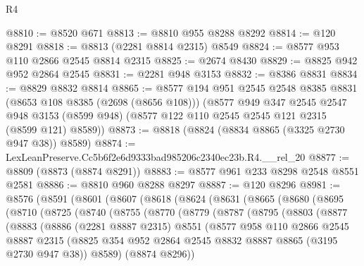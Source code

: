 \begin{lexlean}{R4}
\begin{coremodule}
@8810 := @8520 @671
@8813 := @8810 @955 @8288 @8292
@8814 := @120 @8291
@8818 := @8813 (@2281 @8814 @2315) @8549
@8824 := @8577 @953 @110 @2866 @2545 @8814 @2315
@8825 := @2674 @8430
@8829 := @8825 @942 @952 @2864 @2545
@8831 := @2281 @948 @3153
@8832 := @8386 @8831
@8834 := @8829 @8832 @8814
@8865 := @8577
    @194
    @951
    @2545
    @2548
    @8385
    @8831
    (@8653 @108 @8385 (@2698 (@8656 @108)))
    (@8577
      @949
      @347
      @2545
      @2547
      @948
      @3153
      (@8599 @948)
      (@8577 @122 @110 @2545 @2545 @121 @2315 (@8599 @121) @8589))
@8873 := @8818 (@8824 (@8834 @8865 (@3325 @2730 @947 @38)) @8589)
@8874 := LexLeanPreserve.Cc5b6f2e6d9333bad985206c2340ec23b.R4.__rel_20
@8877 := @8809 (@8873 (@8874 @8291))
@8883 := @8577 @961 @233 @8298 @2548 @8551 @2581
@8886 := @8810 @960 @8288 @8297
@8887 := @120 @8296
@8981 := @8576
    (@8591
      (@8601
        (@8607
          (@8618
            (@8624
              (@8631
                (@8665
                  (@8680
                    (@8695
                      (@8710
                        (@8725
                          (@8740
                            (@8755
                              (@8770
                                (@8779
                                  (@8787
                                    (@8795
                                      (@8803
                                        (@8877
                                          (@8883
                                            (@8886
                                              (@2281 @8887 @2315)
                                              @8551
                                              (@8577
                                                @958
                                                @110
                                                @2866
                                                @2545
                                                @8887
                                                @2315
                                                (@8825
                                                  @354
                                                  @952
                                                  @2864
                                                  @2545
                                                  @8832
                                                  @8887
                                                  @8865
                                                  (@3195 @2730 @947 @38))
                                                @8589)
                                              (@8874 @8296))

\end{coremodule}
\end{lexlean}
